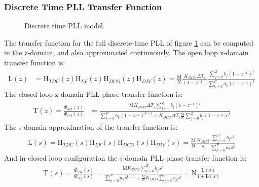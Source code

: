 \subsubsection{Discrete Time PLL Transfer Function}\label{discrete_pll_tf}
	\begin{figure}[htb!]
		\center
		\caption{Discrete time PLL model.}
		\label{fig:discrete_pll2}
	\end{figure}
	The transfer function for the full discrete-time PLL of figure \ref{fig:discrete_pll2} can be computed in the z-domain, and also approximated continuously. The open loop z-domain transfer function is:
	\begin{align}
		\mathrm{L}(z) &= \mathrm{H}_{TDC}(z)\mathrm{H}_{LF}(z)\mathrm{H}_{DCO}(z)\mathrm{H}_{DIV}(z)
		= \frac{\mathrm{M}}{\mathrm{N}}\frac{K_{DCO}\Delta T_s}{(1-z^{-1})}\frac{\sum_{j=0}^Z b_j(1-z^{-1})^j}{\sum_{k=0}^P a_k(1-z^{-1})^k}\label{eq:z_open_loop}
	\end{align}
	The closed loop z-domain PLL phase transfer function is:
	\begin{align}
		\mathrm{T}(z) = \frac{\Phi_{out}(z)}{\Phi_{ref}(z)} &= \frac{\mathrm{M}K_{DCO}\Delta T_s\sum_{j=0}^Z b_j(1-z^{-1})^j}{\sum_{k=0}^P a_k(1-z^{-1})^{k+1} + K_{DCO}\Delta T_s\frac{\mathrm{M}}{\mathrm{N}}\sum_{j=0}^Z b_j(1-z^{-1})^j}%
	\end{align}
	The s-domain approximation of the transfer function is:
	\begin{align}
		\mathrm{L}(s) = \mathrm{H}_{TDC}(s)\mathrm{H}_{LF}(s)\mathrm{H}_{DCO}(s)\mathrm{H}_{DIV}(s) = \frac{\mathrm{M}}{\mathrm{N}}\frac{K_{DCO}}{s} \frac{\sum_{j=0}^Z b_js^j}{\sum_{k=0}^P a_ks^k}
	\end{align}
	And in closed loop configuration the s-domain PLL phase transfer function is:
	\begin{align}
		\mathrm{T}(s)=\frac{\Phi_{out}(s)}{\Phi_{ref}(s)} = \frac{\mathrm{M}K_{DCO}\sum_{j=0}^Z b_js^j}{\sum_{k=0}^P a_ks^{k+1} + \frac{\mathrm{M}}{\mathrm{N}}K_{DCO}\sum_{j=0}^Z b_js^j} = \mathrm{N}\frac{\mathrm{L}(s)}{1+\mathrm{L}(s)}
	\end{align}


